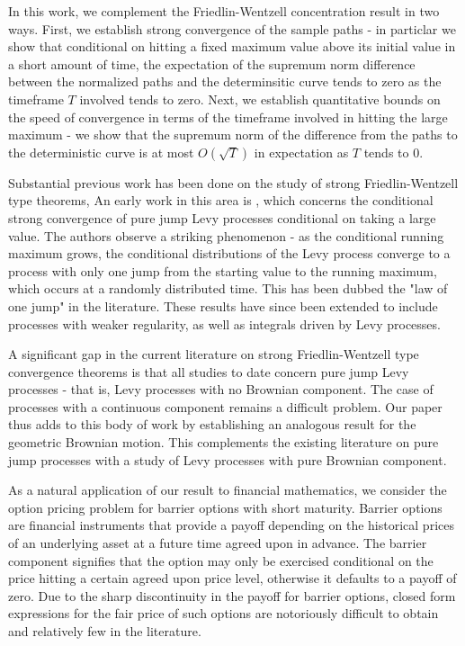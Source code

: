 \documentclass{article}
\theoremstyle{definition}
\theoremstyle{definition}
\begin{document}
In this work, we complement the Friedlin-Wentzell concentration result in two ways. First, we establish strong convergence of the sample paths - in particlar we show that conditional on hitting a fixed maximum value above its initial value in a short amount of time, the expectation of the supremum norm difference between the normalized paths and the determinsitic curve tends to zero as the timeframe $T$ involved tends to zero. Next, we establish quantitative bounds on the speed of convergence in terms of the timeframe involved in hitting the large maximum - we show that the supremum norm of the difference from the paths to the deterministic curve is at most $O(\sqrt T)$ in expectation as $T$ tends to $0$.

Substantial previous work has been done on the study of strong Friedlin-Wentzell type theorems, An early work in this area is \cite{HULT2005249}, which concerns the conditional strong convergence of pure jump Levy processes conditional on taking a large value. The authors observe a striking phenomenon - as the conditional running maximum grows, the conditional distributions of the Levy process converge to a process with only one jump from the starting value to the running maximum, which occurs at a randomly distributed time. This has been dubbed the "law of one jump" in the literature. These results have since been extended to include processes with weaker regularity, as well as integrals driven by Levy processes.

A significant gap in the current literature on strong Friedlin-Wentzell type convergence theorems is that all studies to date concern pure jump Levy processes - that is, Levy processes with no Brownian component. The case of processes with a continuous component remains a difficult problem. Our paper thus adds to this body of work by establishing an analogous result for the geometric Brownian motion. This complements the existing literature on pure jump processes with a study of Levy processes with pure Brownian component.

As a natural application of our result to financial mathematics, we consider the option pricing problem for barrier options with short maturity. Barrier options are financial instruments that provide a payoff depending on the historical prices of an underlying asset at a future time agreed upon in advance. The barrier component signifies that the option may only be exercised conditional on the price hitting a certain agreed upon price level, otherwise it defaults to a payoff of zero. Due to the sharp discontinuity in the payoff for barrier options, closed form expressions for the fair price of such options are notoriously difficult to obtain and relatively few in the literature.
\end{document}
